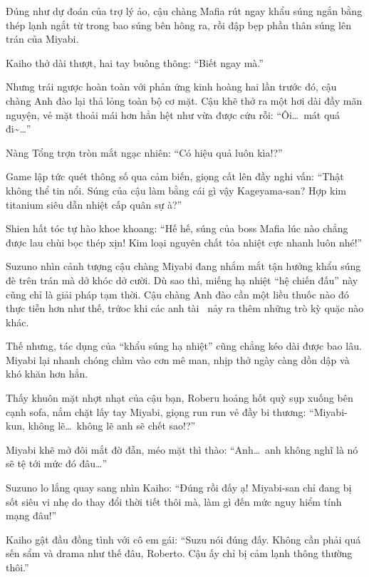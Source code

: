 \documentclass[../main.tex]{subfiles}
\begin{document}
Đúng như dự đoán của trợ lý ảo, cậu chàng Mafia rút ngay khẩu súng ngắn bằng thép lạnh ngắt từ trong bao súng bên hông ra, rồi đập bẹp phần thân súng lên trán của Miyabi.

Kaiho thở dài thượt, hai tay buông thõng: ``Biết ngay mà.''

Nhưng trái ngược hoàn toàn với phản ứng kinh hoàng hai lần trước đó, cậu chàng Anh đào lại thả lỏng toàn bộ cơ mặt. Cậu khẽ thở ra một hơi dài đầy mãn nguyện, vẻ mặt thoải mái hơn hẳn hệt như vừa được cứu rỗi: ``Ôi\dots\ mát quá đi\~{}\dots''


Nàng Tổng trợn tròn mắt ngạc nhiên: ``Có hiệu quả luôn kìa!?''

Game lập tức quét thông số qua cảm biến, giọng cất lên đầy nghi vấn: ``Thật không thể tin nổi. Súng của cậu làm bằng cái gì vậy Kageyama-san? Hợp kim titanium siêu dẫn nhiệt cấp quân sự à?''

Shien hất tóc tự hào khoe khoang: ``Hế hế, súng của boss Mafia lúc nào chẳng được lau chùi bọc thép xịn! Kim loại nguyên chất tỏa nhiệt cực nhanh luôn nhé!''

Suzuno nhìn cảnh tượng cậu chàng Miyabi đang nhắm mắt tận hưởng khẩu súng đè trên trán mà dở khóc dở cười. Dù sao thì, miếng hạ nhiệt ``hệ chiến đấu'' này cũng chỉ là giải pháp tạm thời. Cậu chàng Anh đào cần một liều thuốc nào đó thực tiễn hơn như thế, trứoc khi các anh tài \hls\ nảy ra thêm những trò kỳ quặc nào khác.

\ct

Thế nhưng, tác dụng của ``khẩu súng hạ nhiệt'' cũng chẳng kéo dài được bao lâu. Miyabi lại nhanh chóng chìm vào cơn mê man, nhịp thở ngày càng dồn dập và khó khăn hơn hẳn.

Thấy khuôn mặt nhợt nhạt của cậu bạn, Roberu hoảng hốt quỳ sụp xuống bên cạnh sofa, nắm chặt lấy tay Miyabi, giọng run run vẻ đầy bi thương: ``Miyabi-kun, không lẽ\dots\ không lẽ anh sẽ chết sao!?''

Miyabi khẽ mở đôi mắt đờ đẫn, méo mặt thì thào: ``Anh\dots\ anh không nghĩ là nó sẽ tệ tới mức đó đâu\dots''

Suzuno lo lắng quay sang nhìn Kaiho: ``Đúng rồi đấy ạ! Miyabi-san chỉ đang bị sốt siêu vi nhẹ do thay đổi thời tiết thôi mà, làm gì đến mức nguy hiểm tính mạng đâu!''

Kaiho gật đầu đồng tình với cô em gái: ``Suzu nói đúng đấy. Không cần phải quá sến sẩm và drama như thế đâu, Roberto. Cậu ấy chỉ bị cảm lạnh thông thường thôi.''
\end{document}
